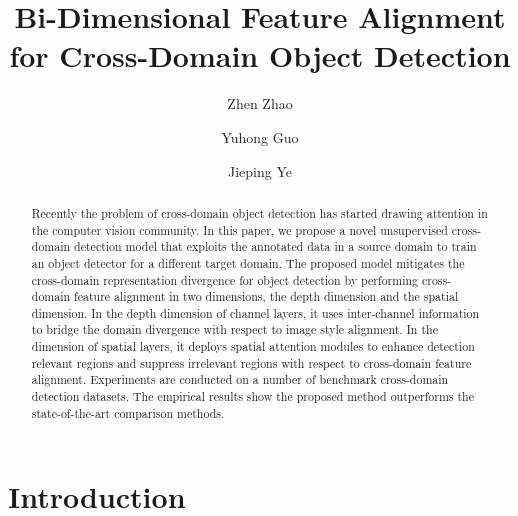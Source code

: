 \documentclass[runningheads]{llncs}
\begin{document}
\pagestyle{headings}
\mainmatter
\def\ECCVSubNumber{}  

\title{Bi-Dimensional Feature Alignment for Cross-Domain Object Detection} 

\begin{comment}
\titlerunning{ECCV-20 submission ID \ECCVSubNumber} 
\authorrunning{ECCV-20 submission ID \ECCVSubNumber} 
\author{Anonymous ECCV workshop submission}
\institute{Paper ID \ECCVSubNumber}
\end{comment}


\author{Zhen Zhao \and
Yuhong Guo \and
Jieping Ye 
}
\maketitle

\begin{abstract}
Recently the problem of cross-domain object detection has started drawing attention in the computer vision community.
In this paper, we propose a novel unsupervised cross-domain detection model that exploits the annotated 
data in a source domain to train an object detector for a different target domain. 
The proposed model mitigates the cross-domain representation divergence for object detection
by performing cross-domain feature alignment in two dimensions,
the depth dimension and the spatial dimension. 
In the depth dimension of channel layers, it uses 
inter-channel information 
to bridge the domain divergence with respect to image style alignment. 
In the dimension of spatial layers, it deploys spatial attention modules
to enhance detection relevant regions and suppress irrelevant regions
with respect to cross-domain feature alignment. 
Experiments are conducted on a number of benchmark cross-domain detection datasets.
The empirical results show the proposed method outperforms the state-of-the-art comparison methods. 

\end{abstract}


\section{Introduction}
\end{document}
